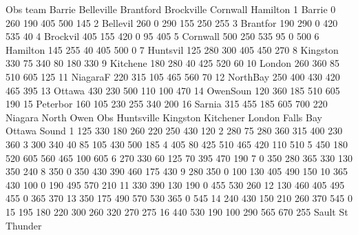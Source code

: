 \documentclass{article}
\begin{document}
\begin{Woutput}
Obs   team   Barrie Belleville Brantford Brockville Cornwall Hamilton
  1 Barrie       0      260        190       405       500      145
  2 Bellevil   260        0        290       155       250      255
  3 Brantfor   190      290          0       420       535       40
  4 Brockvil   405      155        420         0        95      405
  5 Cornwall   500      250        535        95         0      500
  6 Hamilton   145      255         40       405       500        0
  7 Huntsvil   125      280        300       405       450      270
  8 Kingston   330       75        340        80       180      330
  9 Kitchene   180      280         40       425       520       60
 10 London     260      360         85       510       605      125
 11 NiagaraF   220      315        105       465       560       70
 12 NorthBay   250      400        430       420       465      395
 13 Ottawa     430      230        500       110       100      470
 14 OwenSoun   120      360        185       510       605      190
 15 Peterbor   160      105        230       255       340      200
 16 Sarnia     315      455        185       605       700      220
                                             Niagara  North           Owen
Obs Huntsville  Kingston  Kitchener  London   Falls    Bay   Ottawa  Sound
  1     125        330        180      260      220     250    430     120
  2     280         75        280      360      315     400    230     360
  3     300        340         40       85      105     430    500     185
  4     405         80        425      510      465     420    110     510
  5     450        180        520      605      560     465    100     605
  6     270        330         60      125       70     395    470     190
  7       0        350        280      365      330     130    350     240
  8     350          0        350      430      390     460    175     430
  9     280        350          0      100      130     405    490     150
 10     365        430        100        0      190     495    570     210
 11     330        390        130      190        0     455    530     260
 12     130        460        405      495      455       0    365     370
 13     350        175        490      570      530     365      0     545
 14     240        430        150      210      260     370    545       0
 15     195        180        220      300      260     320    270     275
 16     440        530        190      100      290     565    670     255
                            Sault       St      Thunder

\end{Woutput}
\end{document}
